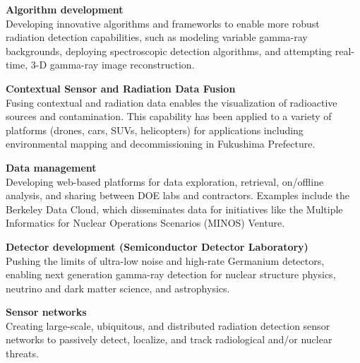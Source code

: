 \textbf{Algorithm development}\\
Developing innovative algorithms and frameworks to enable more robust radiation detection capabilities, such as modeling variable gamma-ray backgrounds, deploying spectroscopic detection algorithms, and attempting real-time, 3-D gamma-ray image reconstruction.

\textbf{Contextual Sensor and Radiation Data Fusion}\\
Fusing contextual and radiation data enables the visualization of radioactive sources and contamination. 
This capability has been applied to a variety of platforms (drones, cars, SUVs, helicopters) for applications including environmental mapping and decommissioning in Fukushima Prefecture.
 
\textbf{Data management}\\
Developing web-based platforms for data exploration, retrieval, on/offline analysis, and sharing between DOE labs and contractors.
Examples include the Berkeley Data Cloud, which disseminates data for initiatives like the Multiple Informatics for Nuclear Operations Scenarios (MINOS) Venture. 

\textbf{Detector development (Semiconductor Detector Laboratory)}\\
Pushing the limits of ultra-low noise and high-rate Germanium detectors, enabling next generation gamma-ray detection for nuclear structure physics, neutrino and dark matter science, and astrophysics. 
 
\textbf{Sensor networks}\\
Creating large-scale, ubiquitous, and distributed radiation detection sensor networks to passively detect, localize, and track radiological and/or nuclear threats.

\vspace{0.5cm}

